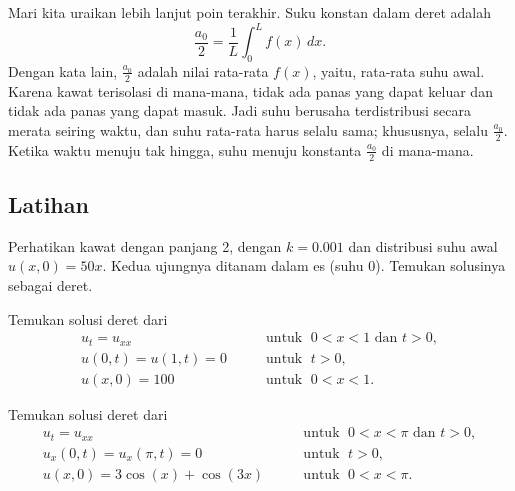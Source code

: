 Mari kita uraikan lebih lanjut poin terakhir.  Suku konstan dalam deret adalah
\begin{equation*}
\frac{a_0}{2} = \frac{1}{L} \int_0^L f(x) \, dx .
\end{equation*}
Dengan kata lain, $\frac{a_0}{2}$ adalah nilai rata-rata $f(x)$, yaitu,
rata-rata suhu awal.  Karena kawat terisolasi
di mana-mana, tidak ada panas yang dapat keluar dan tidak ada panas yang dapat masuk.  Jadi suhu
berusaha terdistribusi secara merata seiring waktu, dan suhu rata-rata harus selalu
sama; khususnya, selalu $\frac{a_0}{2}$.  Ketika waktu menuju
tak hingga, suhu menuju konstanta $\frac{a_0}{2}$ di mana-mana.

\subsection{Latihan}

\begin{exercise}
Perhatikan kawat dengan panjang 2, dengan $k=0.001$ dan distribusi
suhu awal $u(x,0) = 50 x$.  Kedua ujungnya
ditanam dalam es (suhu 0).  Temukan solusinya sebagai deret.
\end{exercise}

\begin{exercise}
Temukan solusi deret dari
\begin{equation*}
\begin{array}{ll}
u_t =  u_{xx} & \qquad \text{untuk } \; 0 < x < 1 \text{ dan } t > 0, \\
u(0,t) = u(1,t) = 0 & \qquad \text{untuk } \; t > 0, \\
u(x,0) = 100 & \qquad \text{untuk } \; 0 < x < 1 .
\end{array}
\end{equation*}
\end{exercise}

\begin{exercise}
Temukan solusi deret dari
\begin{equation*}
\begin{array}{ll}
u_t =  u_{xx} & \qquad \text{untuk } \; 0 < x < \pi \text{ dan } t > 0, \\
u_x(0,t) = u_x(\pi,t) = 0 & \qquad \text{untuk } \; t > 0, \\
u(x,0) = 3\cos (x) + \cos (3x) & \qquad \text{untuk } \; 0 < x < \pi .
\end{array}
\end{equation*}
\end{exercise}

